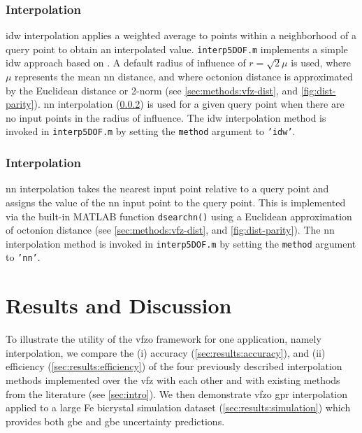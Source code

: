 \documentclass[final,twocolumn,12pt]{elsarticle}
\newcommand{\inpt}{input}
\begin{document}
{\subsubsection{ Interpolation}
\label{sec:methods:interp:idw}


\Gls{idw} interpolation applies a weighted average to points within a neighborhood of a query point to obtain an interpolated value. \texttt{interp5DOF.m} implements a simple \gls{idw} approach based on \cite{tovarInverseDistanceWeight2020}. A default radius of influence of $r=\sqrt{2} \mu$ is used, where $\mu$ represents the mean \gls{nn} distance, and where octonion distance is approximated by the Euclidean distance or 2-norm (see \cref{sec:methods:vfz-dist}, and \cref{fig:dist-parity}). \gls{nn} interpolation (\cref{sec:methods:interp:nn}) is used for a given query point when there are no \inpt{} points in the radius of influence. The \gls{idw} interpolation method is invoked in \texttt{interp5DOF.m} by setting the \texttt{method} argument to \texttt{'idw'}.

\subsubsection{ Interpolation}
\label{sec:methods:interp:nn}


\Gls{nn} interpolation takes the nearest \inpt{} point relative to a query point and assigns the value of the \gls{nn} \inpt{} point to the query point. This is implemented via the built-in MATLAB function \texttt{dsearchn()} using a Euclidean approximation of octonion distance (see \cref{sec:methods:vfz-dist}, and \cref{fig:dist-parity}). The \gls{nn} interpolation method is invoked in \texttt{interp5DOF.m} by setting the \texttt{method} argument to \texttt{'nn'}.

\section{Results and Discussion} \label{sec:results}

To illustrate the utility of the \gls{vfzo} framework for one application, namely interpolation, we compare the (i) accuracy (\cref{sec:results:accuracy}), and (ii) efficiency (\cref{sec:results:efficiency}) of the four previously described interpolation methods implemented over the \gls{vfz} with each other and with existing methods from the literature (see \cref{sec:intro}). We then demonstrate \gls{vfzo} \gls{gpr} interpolation applied to a large Fe bicrystal simulation dataset \cite{kimPhasefieldModeling3D2014} (\cref{sec:results:simulation}) which provides both \gls{gbe} and \gls{gbe} uncertainty predictions.

}
\end{document}
